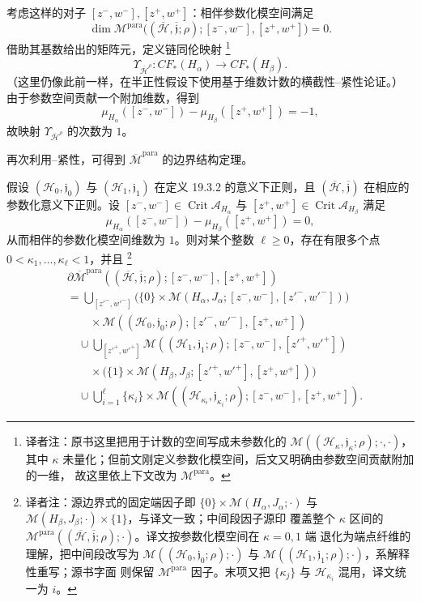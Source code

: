 考虑这样的对子 $[z^-,w^-],[z^+,w^+]$：相伴参数化模空间满足
\[
 \dim\mathcal M^{\mathrm{para}}
 \bigl((\overline{\mathcal H},\overline{\mathfrak j};\rho);
 [z^-,w^-],[z^+,w^+]\bigr)=0.
\]
借助其基数给出的矩阵元，定义链同伦映射
\footnote{译者注：原书这里把用于计数的空间写成未参数化的
$\mathcal M((\mathcal H_\kappa,\mathfrak j_\kappa;\rho);\cdot,\cdot)$，其中
$\kappa$ 未量化；但前文刚定义参数化模空间，后文又明确由参数空间贡献附加的一维，
故这里依上下文改为 $\mathcal M^{\mathrm{para}}$。}
\[
 \Upsilon_{\overline{\mathcal H}^{\rho}}:
 CF_*(H_\alpha)\longrightarrow CF_*(H_\beta).
\]
（这里仍像此前一样，在半正性假设下使用基于维数计数的横截性--紧性论证。）
由于参数空间贡献一个附加维数，得到
\[
 \mu_{H_\alpha}([z^-,w^-])-\mu_{H_\beta}([z^+,w^+])=-1,
\]
故映射 $\Upsilon_{\overline{\mathcal H}^{\rho}}$ 的次数为 $1$。

再次利用\personGromov{}--\personFloer{}紧性，可得到
$\overline{\mathcal M}^{\mathrm{para}}$ 的边界结构定理。

\begin{proposition}
\label{prop:boundary-parameterized-chain-homotopy-moduli}
假设 $(\mathcal H_0,\mathfrak j_0)$ 与 $(\mathcal H_1,\mathfrak j_1)$ 在定义 19.3.2
的意义下\personFloer{}正则，且 $(\overline{\mathcal H},\overline{\mathfrak j})$ 在相应的
参数化意义下\personFloer{}正则。设
$[z^-,w^-]\in\operatorname{Crit}\mathcal A_{H_\alpha}$ 与
$[z^+,w^+]\in\operatorname{Crit}\mathcal A_{H_\beta}$ 满足
\[
 \mu_{H_\alpha}([z^-,w^-])-\mu_{H_\beta}([z^+,w^+])=0,
\]
从而相伴的参数化模空间维数为 $1$。则对某个整数 $\ell\geq0$，存在有限多个点
$0<\kappa_1,\ldots,\kappa_\ell<1$，并且
\footnote{译者注：源边界式的固定端因子即
$\{0\}\times\mathcal M(H_\alpha,J_\alpha;\cdot)$ 与
$\mathcal M(H_\beta,J_\beta;\cdot)\times\{1\}$，与译文一致；中间段因子源印
覆盖整个 $\kappa$ 区间的 $\mathcal M^{\mathrm{para}}((\overline{\mathcal H},
\overline{\mathfrak j};\rho);\cdot)$。译文按参数化模空间在 $\kappa=0,1$ 端
退化为端点纤维的理解，把中间段改写为
$\mathcal M((\mathcal H_0,\mathfrak j_0;\rho);\cdot)$ 与
$\mathcal M((\mathcal H_1,\mathfrak j_1;\rho);\cdot)$，系解释性重写；源书字面
则保留 $\mathcal M^{\mathrm{para}}$ 因子。末项又把 $\{\kappa_j\}$ 与
$\mathcal H_{\kappa_i}$ 混用，译文统一为 $i$。}
\[
\begin{aligned}
 &\partial\overline{\mathcal M}^{\mathrm{para}}
 ((\overline{\mathcal H},\overline{\mathfrak j};\rho);
 [z^-,w^-],[z^+,w^+])\\
 &=\bigcup_{[z'^-,w'^-]}
 \bigl(\{0\}\times\mathcal M(H_\alpha,J_\alpha;[z^-,w^-],[z'^-,w'^-])\bigr)\\
 &\qquad\times
 \mathcal M((\mathcal H_0,\mathfrak j_0;\rho);
 [z'^-,w'^-],[z^+,w^+])\\
 &\quad\cup\bigcup_{[z'^+,w'^+]}
 \mathcal M((\mathcal H_1,\mathfrak j_1;\rho);
 [z^-,w^-],[z'^+,w'^+])\\
 &\qquad\times
 \bigl(\{1\}\times\mathcal M(H_\beta,J_\beta;[z'^+,w'^+],[z^+,w^+])\bigr)\\
 &\quad\cup\bigcup_{i=1}^{\ell}\{\kappa_i\}\times
 \mathcal M((\mathcal H_{\kappa_i},\mathfrak j_{\kappa_i};\rho);
 [z^-,w^-],[z^+,w^+]).
\end{aligned}
\]
\end{proposition}

